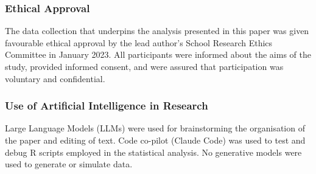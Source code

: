 \documentclass[
  12pt,
  letterpaper,
  DIV=11,
  numbers=noendperiod]{scrartcl}
\theoremstyle{plain}
\theoremstyle{definition}
\begin{document}
\begin{table}

\caption{\label{tbl-sample-characteristics}RDS Sample Characteristics by
Nationality Cluster and Recruitment Wave. Source: Authors' Own Work.}


\end{table}%

\subsubsection{Ethical Approval}\label{ethical-approval}

The data collection that underpins the analysis presented in this paper
was given favourable ethical approval by the lead author's School
Research Ethics Committee in January 2023. All participants were
informed about the aims of the study, provided informed consent, and
were assured that participation was voluntary and confidential.

\subsubsection{Use of Artificial Intelligence in
Research}\label{use-of-artificial-intelligence-in-research}

Large Language Models (LLMs) were used for brainstorming the
organisation of the paper and editing of text. Code co-pilot (Claude
Code) was used to test and debug R scripts employed in the statistical
analysis. No generative models were used to generate or simulate data.
\end{document}
